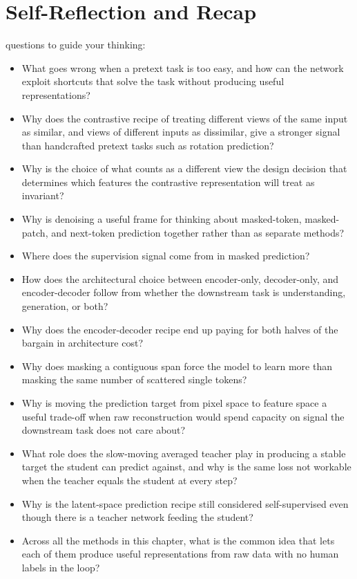 \fi

\section{Self-Reflection and Recap}

 questions to guide your thinking:
\begin{itemize}
    \item What goes wrong when a pretext task is too easy, and how can the network exploit shortcuts that solve the task without producing useful representations?
    \item Why does the contrastive recipe of treating different views of the same input as similar, and views of different inputs as dissimilar, give a stronger signal than handcrafted pretext tasks such as rotation prediction?
    \item Why is the choice of what counts as a different view the design decision that determines which features the contrastive representation will treat as invariant?
    \item Why is denoising a useful frame for thinking about masked-token, masked-patch, and next-token prediction together rather than as separate methods?
    \item Where does the supervision signal come from in masked prediction?
    \item How does the architectural choice between encoder-only, decoder-only, and encoder-decoder follow from whether the downstream task is understanding, generation, or both?
    \item Why does the encoder-decoder recipe end up paying for both halves of the bargain in architecture cost?
    \item Why does masking a contiguous span force the model to learn more than masking the same number of scattered single tokens?
    \item Why is moving the prediction target from pixel space to feature space a useful trade-off when raw reconstruction would spend capacity on signal the downstream task does not care about?
    \item What role does the slow-moving averaged teacher play in producing a stable target the student can predict against, and why is the same loss not workable when the teacher equals the student at every step?
    \item Why is the latent-space prediction recipe still considered self-supervised even though there is a teacher network feeding the student?
    \item Across all the methods in this chapter, what is the common idea that lets each of them produce useful representations from raw data with no human labels in the loop?
\end{itemize}

